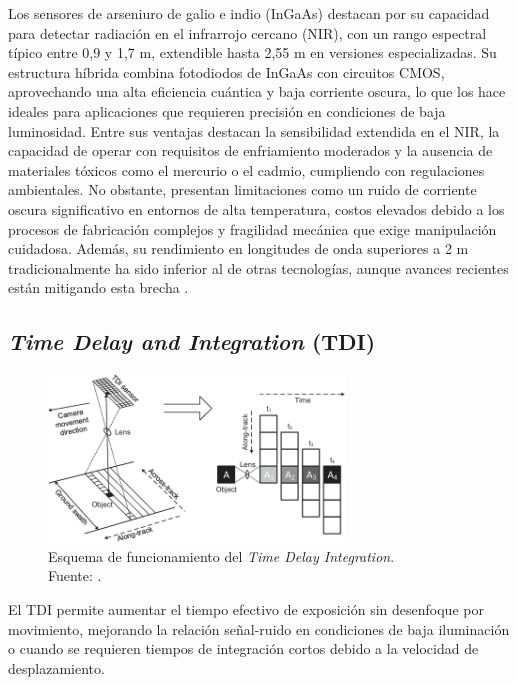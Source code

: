 Los sensores de arseniuro de galio e indio (InGaAs) destacan por su capacidad para detectar radiación en el infrarrojo cercano (NIR), con un rango espectral típico entre 0,9 y 1,7 \textmu m, extendible hasta 2,55 \textmu m en versiones especializadas. Su estructura híbrida combina fotodiodos de InGaAs con circuitos CMOS, aprovechando una alta eficiencia cuántica y baja corriente oscura, lo que los hace ideales para aplicaciones que requieren precisión en condiciones de baja luminosidad. Entre sus ventajas destacan la sensibilidad extendida en el NIR, la capacidad de operar con requisitos de enfriamiento moderados y la ausencia de materiales tóxicos como el mercurio o el cadmio, cumpliendo con regulaciones ambientales. No obstante, presentan limitaciones como un ruido de corriente oscura significativo en entornos de alta temperatura, costos elevados debido a los procesos de fabricación complejos y fragilidad mecánica que exige manipulación cuidadosa. Además, su rendimiento en longitudes de onda superiores a 2 \textmu m tradicionalmente ha sido inferior al de otras tecnologías, aunque avances recientes están mitigando esta brecha \cite{henini_handbook_2002}.


\subsection{\textit{Time Delay and Integration} (TDI)}\label{sec:tdi}

\begin{figure}[H]
    \centering
    \includegraphics[width=0.7\textwidth]{3.Conceptos_Previos/TDI.png}
    \caption{Esquema de funcionamiento del \textit{Time Delay Integration}.\\Fuente: \cite{tdi_sensor2017}.}
    \label{fig:TDI}
\end{figure}

El TDI permite aumentar el tiempo efectivo de exposición sin desenfoque por movimiento, mejorando la relación señal-ruido en condiciones de baja iluminación o cuando se requieren tiempos de integración cortos debido a la velocidad de desplazamiento\cite{design_workshop_optical_2023}.


